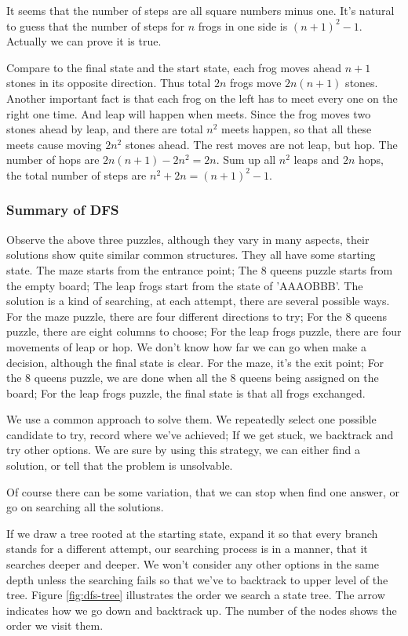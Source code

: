 \documentclass[UTF8]{article}
\begin{document}
It seems that the number of steps are all square numbers minus one.
It's natural to guess that the number of steps for $n$ frogs in one side is
$(n+1)^2 - 1$. Actually we can prove it is true.

Compare to the final state and the start state, each frog moves ahead $n+1$
stones in its opposite direction. Thus total $2n$ frogs move $2n(n+1)$ stones.
Another important fact is that each frog on the left has to meet every one
on the right one time. And leap will happen when meets. Since the frog moves two
stones ahead by leap, and there are total $n^2$ meets happen, so that all these
meets cause moving $2n^2$ stones ahead. The rest moves are not leap, but hop.
The number of hops are $2n(n+1) - 2n^2 = 2n$. Sum up all $n^2$ leaps and $2n$
hops, the total number of steps are $n^2 + 2n = (n+1)^2 -1$.

\subsubsection{Summary of DFS}
Observe the above three puzzles, although they vary in many aspects, their
solutions show quite similar common structures. They all have some starting
state. The maze starts from the entrance point; The 8 queens puzzle starts
from the empty board; The leap frogs start from the state of 'AAAOBBB'.
The solution is a kind of searching, at each attempt, there are several
possible ways. For the maze puzzle, there are four different directions to try;
For the 8 queens puzzle, there are eight columns to choose; For the leap
frogs puzzle, there are four movements of leap or hop. We don't know how
far we can go when make a decision, although the final state is clear.
For the maze, it's the exit point; For the 8 queens puzzle, we are done
when all the 8 queens being assigned on the board; For the leap frogs
puzzle, the final state is that all frogs exchanged.

We use a common approach to solve them. We repeatedly select one possible
candidate to try, record where we've achieved; If we get stuck, we backtrack
and try other options. We are sure by using this strategy, we can either
find a solution, or tell that the problem is unsolvable.

Of course there can be some variation, that we can stop when find one answer,
or go on searching all the solutions.

If we draw a tree rooted at the starting state, expand it so that every
branch stands for a different attempt, our searching process
is in a manner, that it searches deeper and deeper. We won't consider any
other options in the same depth unless the searching fails so that we've
to backtrack to upper level of the tree. Figure \ref{fig:dfs-tree} illustrates
the order we search a state tree. The arrow indicates how we go down
and backtrack up. The number of the nodes shows the order we visit them.
\end{document}
